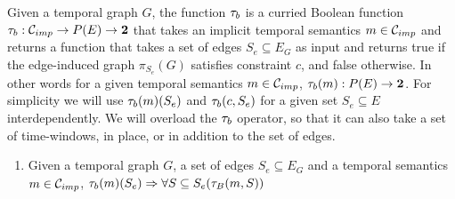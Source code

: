 \begin{defn}
  Given a temporal graph $G$, the function $\tau_b$ is a curried Boolean
  function $\tau_b : \mathcal{C}_{imp} \to P(E) \to \textbf{2} $ that takes an implicit
  temporal semantics $m \in \mathcal{C}_{imp}$ and returns a function that takes a
  set of edges $S_e \subseteq E_G$ as input and returns true if the edge-induced
  graph $\pi_{S_e}(G)$ satisfies constraint $c$, and false otherwise. In other
  words for a given temporal semantics $m \in \mathcal{C}_{imp}$, $\tau_b(m)
  : P(E) \to \textbf{2}$. For simplicity we will use $\tau_b(m)(S_e)$
  and $\tau_b(c,S_e)$ for a given set $S_e \subseteq E$ interdependently. We
  will overload the $\tau_b$ operator, so that it can also take a set of
  time-windows, in place, or in addition to the set of edges.
\end{defn}

\begin{enumerate}
  \item Given a temporal graph $G$, a set of edges $S_e \subseteq E_G$ and a
    temporal semantics $m \in \mathcal{C}_{imp}$, $\tau_b(m)(S_e)
    \Rightarrow \forall S \subseteq S_e (\tau_B(m, S))$
\end{enumerate}
